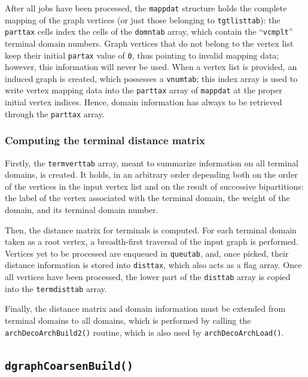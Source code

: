 After all jobs have been processed, the \texttt{mappdat} structure
holds the complete mapping of the graph vertices (or just those
belonging to \texttt{tgtlisttab}): the \texttt{parttax} cells index
the cells of the \texttt{domntab} array, which contain the
``\texttt{vcmplt}'' terminal domain numbers. Graph vertices that do
not belong to the vertex list keep their initial \texttt{partax} value
of \texttt{0}, thus pointing to invalid mapping data; however, this
information will never be used. When a vertex list is provided, an
induced graph is created, which possesses a \texttt{vnumtab}; this
index array is used to write vertex mapping data into the
\texttt{parttax} array of \texttt{mappdat} at the proper initial
vertex indices. Hence, domain information has always to be retrieved
through the \texttt{parttax} array.

\subsubsection{Computing the terminal distance matrix}

Firstly, the \texttt{termverttab} array, meant to summarize
information on all terminal domains, is created. It holds, in an
arbitrary order depending both on the order of the vertices in the
input vertex list and on the result of successive bipartitions: the
label of the vertex associated with the terminal domain, the weight of
the domain, and its terminal domain number.

Then, the distance matrix for terminals is computed. For each terminal
domain taken as a root vertex, a breadth-first traversal of the input
graph is performed. Vertices yet to be processed are enqueued in
\texttt{queutab}, and, once picked, their distance information is
stored into \texttt{disttax}, which also acts as a flag array. Once
all vertices have been processed, the lower part of the
\texttt{disttab} array is copied into the \texttt{term\lbt disttab}
array.

Finally, the distance matrix and domain information must be extended
from terminal domains to all domains, which is performed by calling the
\texttt{arch\lbt Deco\lbt Arch\lbt Build2()} routine, which is
also used by \texttt{archDeco\lbt Arch\lbt Load()}.

\subsection{\texttt{dgraphCoarsenBuild()}}

